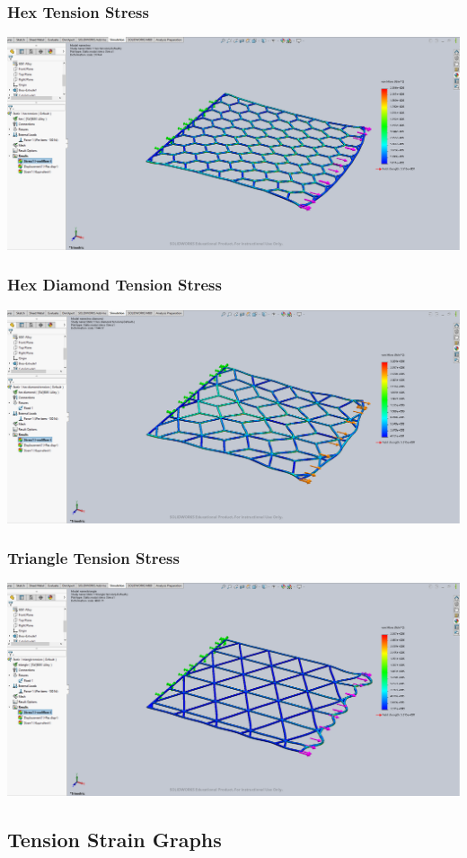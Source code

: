 \documentclass[12pt, letterpaper]{article}
\begin{document}
\begin{singlespace}
\subsubsection{Hex Tension Stress}
\label{ap:h-te-vm}
\includegraphics[width=0.8\linewidth]{./graphs/tension/hex-tension-stress}

\subsubsection{Hex Diamond Tension Stress}
\label{ap:hd-te-vm}
\includegraphics[width=0.8\linewidth]{./graphs/tension/hex-diamond-tension-stress}

\subsubsection{Triangle Tension Stress}
\label{ap:t-te-vm}
\includegraphics[width=0.8\linewidth]{./graphs/tension/triangle-tension-stress}


\subsection{Tension Strain Graphs}
\label{ap:te-es}


\end{singlespace}
\end{document}
